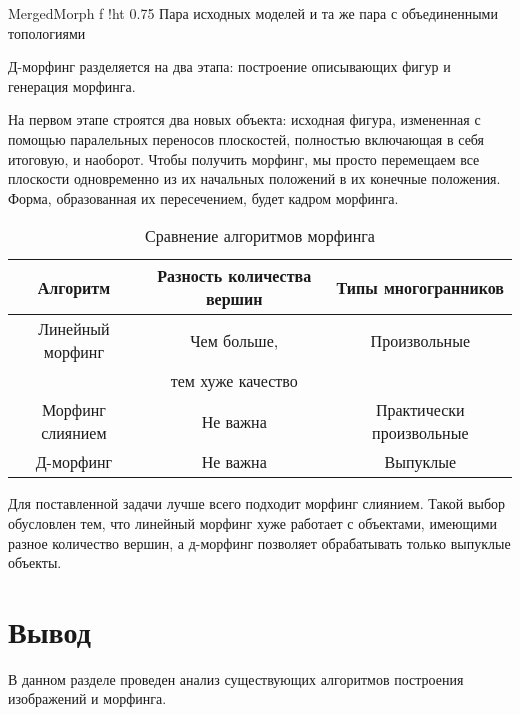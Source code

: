 {MergedMorph}
{f}
{!ht}
{0.75\textwidth}
{Пара исходных моделей и та же пара с объединенными топологиями}

\leavevmode

Д-морфинг разделяется на два этапа: построение описывающих фигур и генерация морфинга.

На первом этапе строятся два новых объекта: исходная фигура, измененная с помощью паралельных переносов плоскостей, полностью включающая в себя итоговую, и наоборот.  Чтобы получить морфинг, мы просто перемещаем все плоскости одновременно из их начальных положений в их конечные положения. Форма, образованная их пересечением, будет кадром морфинга.~\cite{DMorph}

\begin{table}[ht]
	\small
	\begin{center}
		\begin{threeparttable}
			\caption{Сравнение алгоритмов морфинга}
			\label{tbl:test_morph}
			\begin{tabular}{|c|c|c|}
				\hline
				\bfseries Алгоритм & \bfseries Разность количества вершин & \bfseries Типы многогранников \\
				\hline
				Линейный морфинг & Чем больше, & Произвольные \\
				& тем хуже качество & \\
				\hline
				Морфинг слиянием & Не важна & Практически произвольные \\
				\hline
				Д-морфинг & Не важна & Выпуклые \\
				\hline
			\end{tabular}
		\end{threeparttable}
	\end{center}
\end{table}

Для поставленной задачи лучше всего подходит морфинг слиянием. Такой выбор обусловлен тем, что линейный морфинг хуже работает с объектами, имеющими разное количество вершин, а д-морфинг позволяет обрабатывать только выпуклые объекты.

\section*{Вывод}
В данном разделе проведен анализ существующих алгоритмов построения изображений и морфинга.